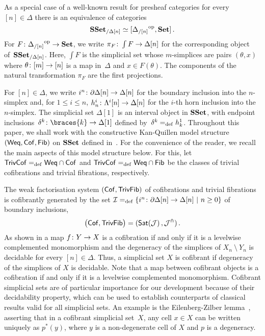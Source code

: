 \documentclass[reqno,10pt,a4paper,oneside,draft]{amsart}
\begin{document}
As a special case of a well-known result for presheaf 
categories for every~$[n] \in \Delta$ there is an equivalence of categories
\begin{equation}
\label{equ:psh-slice-sset}
\mathbf{SSet}_{/\Delta[n]} \simeq  [ {\Delta_{/[n]}}^{\operatorname{op}}, \mathbf{Set}]   \, .
\end{equation}
For $F \colon {\Delta_{/[n]}}^{\operatorname{op}} \to \mathbf{Set}$, we write $\pi_F \colon \int F \to \Delta[n]$
for the corresponding object of~$\mathbf{SSet}_{/ \Delta[n]}$. Here, $\int F$ is the
simplicial set whose $m$-simplices are pairs $(\theta, x)$ where $\theta \colon [m] \to [n]$
is a map in~$\Delta$ and $x \in F(\theta)$. The components of the natural
transformation $\pi_F$ are the first projections.




For $[n] \in \Delta$, we write $i^n \colon  \partial \Delta[n] \to \Delta[n]$ for the boundary inclusion into the $n$-simplex and, for $1 \leq i \leq n$,  
$h^i_n  \colon \Lambda^i[n] \to \Delta[n]$  for the $i$-th horn inclusion into the $n$-simplex. The simplicial set $\Delta[1]$ is an interval object in $\mathbf{SSet}$, with endpoint inclusions~$\kcyl \co \braces{ k} \to \Delta[1]$ defined by~$\delta^k =_{\operatorname{def}} h^1_k$. Throughout this paper, we shall work  with the constructive 
Kan-Quillen model structure $(\mathsf{Weq}, \mathsf{Cof}, \mathsf{Fib})$ on $\mathbf{SSet}$ defined in~\cite{henry2019qms}. 
For the convenience of the reader, we recall the main aspects of this model structure below.
For this, let $\mathsf{TrivCof} =_{\operatorname{def}} \mathsf{Weq} \cap \mathsf{Cof}$ and $\mathsf{TrivCof} =_{\operatorname{def}} \mathsf{Weq} \cap \mathsf{Fib}$ be the classes of trivial cofibrations and trivial fibrations,
respectively. 

The weak factorisation system $(\mathsf{Cof}, \mathsf{TrivFib})$ of cofibrations and trivial fibrations  is cofibrantly generated by the set $\mathcal{I} =_{\operatorname{def}} \{ i^n \colon  \partial \Delta[n] \to \Delta[n] \ | \ n \geq 0 \}$  of boundary 
inclusions, \ie 
\[
\big( \mathsf{Cof}, \mathsf{TrivFib} \big) = ( \mathsf{Sat}(\mathcal{J}) \, , \mathcal{J}^\pitchfork) \, .
\]
As shown in \cite[proposition 5.1.4]{henry2018wms} a map $f \colon Y \to X$ is a cofibration if  and only if 
it is a levelwise complemented monomorphism and the degeneracy of the simplices of $X_n ~\setminus~Y_n$ is decidable for every $[n] \in \Delta$. Thus, a simplicial set $X$ is
cofibrant if  degeneracy of the simplices of $X$ is decidable.
Note that a map between cofibrant objects is a cofibration
if and only if it is a levelwise complemented monomorphism. 
Cofibrant simplicial sets are of particular importance for our development because of their decidability property, which can be used to establish counterparts of classical results valid for all simplicial sets. An example is the Eilenberg-Zilber lemma~\cite[5.1.2]{henry2018wms}, asserting that in a cofibrant simplicial set~$X$, any cell $x \in X$ can be written uniquely as $p^*(y)$, where $y$ is a non-degenerate cell of $X$ and $p$ is a degeneracy. 
\medskip
\end{document}
